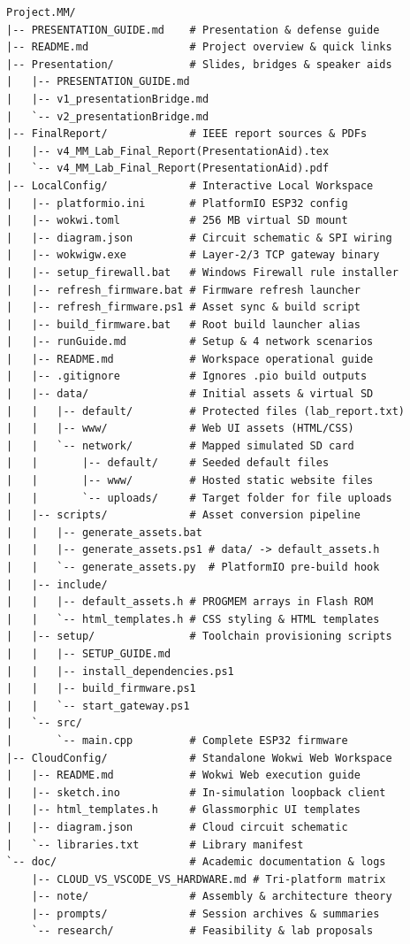 ﻿\documentclass[conference]{IEEEtran}
\begin{document}
\begin{lstlisting}
Project.MM/
|-- PRESENTATION_GUIDE.md    # Presentation & defense guide
|-- README.md                # Project overview & quick links
|-- Presentation/            # Slides, bridges & speaker aids
|   |-- PRESENTATION_GUIDE.md
|   |-- v1_presentationBridge.md
|   `-- v2_presentationBridge.md
|-- FinalReport/             # IEEE report sources & PDFs
|   |-- v4_MM_Lab_Final_Report(PresentationAid).tex
|   `-- v4_MM_Lab_Final_Report(PresentationAid).pdf
|-- LocalConfig/             # Interactive Local Workspace
|   |-- platformio.ini       # PlatformIO ESP32 config
|   |-- wokwi.toml           # 256 MB virtual SD mount
|   |-- diagram.json         # Circuit schematic & SPI wiring
|   |-- wokwigw.exe          # Layer-2/3 TCP gateway binary
|   |-- setup_firewall.bat   # Windows Firewall rule installer
|   |-- refresh_firmware.bat # Firmware refresh launcher
|   |-- refresh_firmware.ps1 # Asset sync & build script
|   |-- build_firmware.bat   # Root build launcher alias
|   |-- runGuide.md          # Setup & 4 network scenarios
|   |-- README.md            # Workspace operational guide
|   |-- .gitignore           # Ignores .pio build outputs
|   |-- data/                # Initial assets & virtual SD
|   |   |-- default/         # Protected files (lab_report.txt)
|   |   |-- www/             # Web UI assets (HTML/CSS)
|   |   `-- network/         # Mapped simulated SD card
|   |       |-- default/     # Seeded default files
|   |       |-- www/         # Hosted static website files
|   |       `-- uploads/     # Target folder for file uploads
|   |-- scripts/             # Asset conversion pipeline
|   |   |-- generate_assets.bat
|   |   |-- generate_assets.ps1 # data/ -> default_assets.h
|   |   `-- generate_assets.py  # PlatformIO pre-build hook
|   |-- include/
|   |   |-- default_assets.h # PROGMEM arrays in Flash ROM
|   |   `-- html_templates.h # CSS styling & HTML templates
|   |-- setup/               # Toolchain provisioning scripts
|   |   |-- SETUP_GUIDE.md
|   |   |-- install_dependencies.ps1
|   |   |-- build_firmware.ps1
|   |   `-- start_gateway.ps1
|   `-- src/
|       `-- main.cpp         # Complete ESP32 firmware
|-- CloudConfig/             # Standalone Wokwi Web Workspace
|   |-- README.md            # Wokwi Web execution guide
|   |-- sketch.ino           # In-simulation loopback client
|   |-- html_templates.h     # Glassmorphic UI templates
|   |-- diagram.json         # Cloud circuit schematic
|   `-- libraries.txt        # Library manifest
`-- doc/                     # Academic documentation & logs
    |-- CLOUD_VS_VSCODE_VS_HARDWARE.md # Tri-platform matrix
    |-- note/                # Assembly & architecture theory
    |-- prompts/             # Session archives & summaries
    `-- research/            # Feasibility & lab proposals
\end{lstlisting}
\end{document}
